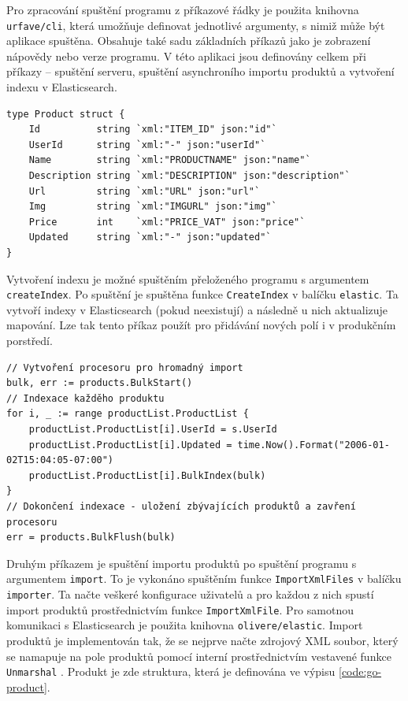 \documentclass[FM,DP]{tulthesis}
\newenvironment{code}
    {\filbreak\captionsetup{type=listing}}{\filbreak}
\begin{document}
Pro zpracování spuštění programu z příkazové řádky je použita knihovna \verb|urfave/cli|, 
která umožňuje definovat jednotlivé argumenty, s nimiž může být aplikace spuštěna.
Obsahuje také sadu základních příkazů jako je zobrazení nápovědy nebo verze programu.
V této aplikaci jsou definovány celkem při příkazy -- spuštění serveru, spuštění asynchroního
importu produktů a vytvoření indexu v Elasticsearch.

\begin{code}
\captionsetup{singlelinecheck=false,justification=raggedright}
\label{code:go-product}
\begin{verbatim}
type Product struct {
    Id          string `xml:"ITEM_ID" json:"id"`
    UserId      string `xml:"-" json:"userId"`
    Name        string `xml:"PRODUCTNAME" json:"name"`
    Description string `xml:"DESCRIPTION" json:"description"`
    Url         string `xml:"URL" json:"url"`
    Img         string `xml:"IMGURL" json:"img"`
    Price       int    `xml:"PRICE_VAT" json:"price"`
    Updated     string `xml:"-" json:"updated"`
}
\end{verbatim}
\end{code}

Vytvoření indexu je možné spuštěním přeloženého programu s argumentem \verb|createIndex|.
Po spuštění je spuštěna funkce \verb|CreateIndex| v balíčku \verb|elastic|. 
Ta vytvoří indexy v Elasticsearch (pokud neexistují) a následně u nich aktualizuje mapování.
Lze tak tento příkaz použít pro přidávání nových polí i v produkčním porstředí.

\begin{code}
\captionsetup{singlelinecheck=false,justification=raggedright}
\label{code:go-indexing}
\begin{verbatim}
// Vytvoření procesoru pro hromadný import
bulk, err := products.BulkStart()
// Indexace každěho produktu
for i, _ := range productList.ProductList {
    productList.ProductList[i].UserId = s.UserId
    productList.ProductList[i].Updated = time.Now().Format("2006-01-02T15:04:05-07:00")
    productList.ProductList[i].BulkIndex(bulk)
}
// Dokončení indexace - uložení zbývajících produktů a zavření procesoru
err = products.BulkFlush(bulk)
\end{verbatim}
\end{code}

Druhým příkazem je spuštění importu produktů po spuštění programu s argumentem \verb|import|.
To je vykonáno spuštěním funkce \verb|ImportXmlFiles| v balíčku \verb|importer|. Ta načte 
veškeré konfigurace uživatelů a pro každou z nich spustí import produktů prostřednictvím 
funkce \verb|ImportXmlFile|. Pro samotnou komunikaci s Elasticsearch je použita knihovna 
\verb|olivere/elastic|. Import produktů je implementován tak, že se nejprve načte zdrojový
XML soubor, který se namapuje na pole produktů pomocí interní prostřednictvím vestavené
funkce \verb|Unmarshal| \cite{go-xml}. Produkt je zde struktura, která je definována 
ve výpisu \ref{code:go-product}.
\end{document}
